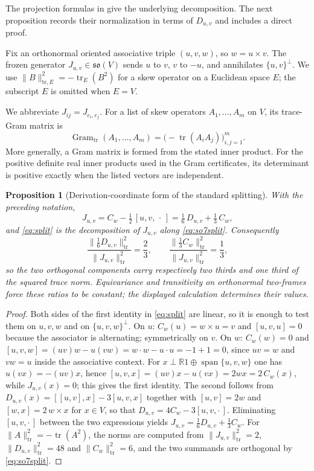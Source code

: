 \documentclass[11pt,a4paper]{article}
\newtheorem{proposition}[proposition]{Proposition}
\newcommand{\RR}{\mathbb R}
\newcommand{\Span}{\operatorname{span}}
\begin{document}
The projection formulas in \cite[(2.23) and (4.5)]{ChemtovKarigiannis2022} give the underlying decomposition.  The next proposition records their normalization in terms of $D_{u,v}$ and includes a direct proof.

Fix an orthonormal oriented associative triple $(u,v,w)$, so $w=u\times v$.
The frozen generator $J_{u,v}\in\mathfrak{so}(V)$ sends $u$ to $v$, $v$ to $-u$,
and annihilates $\{u,v\}^\perp$.  We use
$\|B\|_{\mathrm{tr},E}^2=-\operatorname{tr}_E(B^2)$ for a skew operator on a Euclidean space $E$;
the subscript $E$ is omitted when $E=V$.

We abbreviate $J_{ij}=J_{e_i,e_j}$.  For a list of skew operators $A_1,\ldots,A_m$ on $V$, its trace-Gram matrix is
\[
\operatorname{Gram}_{\mathrm{tr}}(A_1,\ldots,A_m)
=\bigl(-\operatorname{tr}(A_iA_j)\bigr)_{i,j=1}^{m}.
\]
More generally, a Gram matrix is formed from the stated inner product.  For the positive definite real inner products used in the Gram certificates, its determinant is positive exactly when the listed vectors are independent.

\begin{proposition}[Derivation-coordinate form of the standard splitting]
\label{prop:split}
With the preceding notation,
\begin{equation}
J_{u,v}=C_w-\tfrac12\,[u,v,\,\cdot\,]
=\tfrac16\,D_{u,v}+\tfrac13\,C_w ,
\label{eq:split}
\end{equation}
and \eqref{eq:split} is the decomposition of $J_{u,v}$ along
\eqref{eq:so7split}.  Consequently
\[
\frac{\|\tfrac16 D_{u,v}\|_{\mathrm{tr}}^2}{\|J_{u,v}\|_{\mathrm{tr}}^2}=\frac23,
\qquad
\frac{\|\tfrac13 C_w\|_{\mathrm{tr}}^2}{\|J_{u,v}\|_{\mathrm{tr}}^2}=\frac13 ,
\]
so the two orthogonal components carry respectively two thirds and one third of the squared trace norm.  Equivariance and transitivity on orthonormal two-frames force these ratios to be constant; the displayed calculation determines their values.
\end{proposition}

\begin{proof}
Both sides of the first identity in \eqref{eq:split} are linear, so it is
enough to test them on $u,v,w$ and on $\{u,v,w\}^\perp$.  On $u$: $C_w(u)=w\times u=v$
and $[u,v,u]=0$ because the associator is alternating; symmetrically on $v$.
On $w$: $C_w(w)=0$ and $[u,v,w]=(uv)w-u(vw)=w\cdot w-u\cdot u=-1+1=0$, since
$uv=w$ and $vw=u$ inside the associative context.  For $x\perp\RR1\oplus\Span\{u,v,w\}$
one has $u(vx)=-(uv)x$, hence
$[u,v,x]=(uv)x-u(vx)=2wx=2\,C_w(x)$, while $J_{u,v}(x)=0$; this gives the
first identity.  The second follows from
$D_{u,v}(x)=[[u,v],x]-3[u,v,x]$ together with $[u,v]=2w$ and
$[w,x]=2\,w\times x$ for $x\in V$, so that $D_{u,v}=4C_w-3[u,v,\cdot\,]$.
Eliminating $[u,v,\cdot\,]$ between the two expressions yields
$J_{u,v}=\tfrac16 D_{u,v}+\tfrac13 C_w$.  For $\|A\|_{\mathrm{tr}}^2=-\operatorname{tr}(A^2)$, the norms are computed from
$\|J_{u,v}\|_{\mathrm{tr}}^2=2$, $\|D_{u,v}\|_{\mathrm{tr}}^2=48$ and $\|C_w\|_{\mathrm{tr}}^2=6$, and the two summands
are orthogonal by \eqref{eq:so7split}.
\end{proof}
\end{document}
